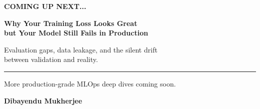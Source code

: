 \documentclass[11pt]{article}
\begin{document}
\vspace*{0.2in}

\newpage


\vspace*{0.5in}

\begin{center}
    {\fontsize{14}{16}\selectfont\color{brandblue}\textbf{COMING UP NEXT...}}
    
    \vspace{0.4in}
    
    {\fontsize{32}{38}\selectfont\color{brandnavy}\bfseries
    Why Your Training Loss Looks Great\\[0.15in]
    but Your Model Still Fails in Production
    }
    
    \vspace{0.4in}
    
    \begin{minipage}{0.7\textwidth}
        \centering
        \color{brandgray}\fontsize{14}{18}\selectfont
        Evaluation gaps, data leakage, and the silent drift\\
        between validation and reality.
    \end{minipage}
\end{center}

\vfill

\begin{center}
    \rule{0.6\textwidth}{0.5pt}
    
    \vspace{0.15in}
    
    {\fontsize{11}{13}\selectfont\color{brandgray}
    More production-grade MLOps deep dives coming soon.
    }
    
    \vspace{0.12in}
    
    {\fontsize{14}{16}\selectfont\color{brandnavy}\textbf{Dibayendu Mukherjee}}
\end{center}

\vspace*{0.2in}

\newpage
\end{document}
